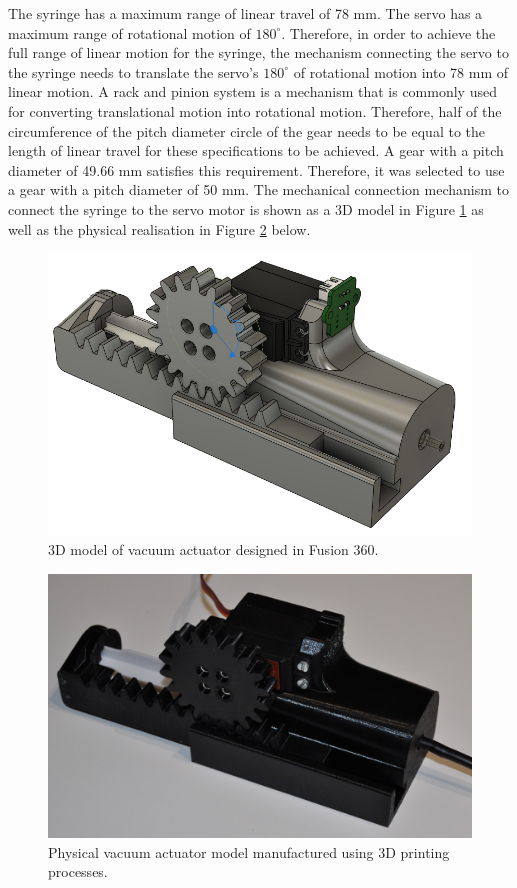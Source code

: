 The syringe has a maximum range of linear travel of 78 mm. The servo has a maximum range of rotational motion of $180^{\circ}$. Therefore, in order to achieve the full range of linear motion for the syringe, the mechanism connecting the servo to the syringe needs to translate the servo's $180^{\circ}$ of rotational motion into 78 mm of linear motion. A rack and pinion system is a mechanism that is commonly used for converting translational motion into rotational motion. Therefore, half of the circumference of the pitch diameter circle of the gear needs to be equal to the length of linear travel for these specifications to be achieved. A gear with a pitch diameter of 49.66 mm satisfies this requirement. Therefore, it was selected to use a gear with a pitch diameter of 50 mm. The mechanical connection mechanism to connect the syringe to the servo motor is shown as a 3D model in Figure \ref{fig:vacuum-actuator-model} as well as the physical realisation in Figure \ref{fig:vacuum-actuator} below.

\begin{figure}[H]
	\centering
	\includegraphics[width=0.6\linewidth]{figures/vacuum-actuator-model.PNG}
	\caption{3D model of vacuum actuator designed in Fusion 360.}
	\label{fig:vacuum-actuator-model}
\end{figure}

\begin{figure}[H]
	\centering
	\includegraphics[width=0.6\linewidth]{figures/vacuum-actuator.JPG}
	\caption{Physical vacuum actuator model manufactured using 3D printing processes.}
	\label{fig:vacuum-actuator}
\end{figure}

